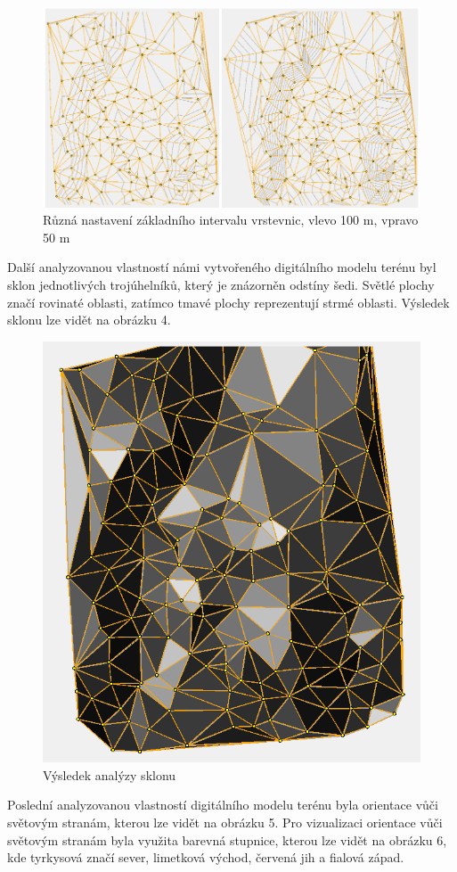 \documentclass{article}
\begin{document}
\begin{spacing}{1.5}
\begin{figure}[htbp]
    \centering
    \includegraphics[width=0.8\linewidth]{images/03vrstevnice.png}
    \caption{Různá nastavení základního intervalu vrstevnic, vlevo 100 m, vpravo 50 m}
    \label{fig:enter-label}
\end{figure}

\newpage
Další analyzovanou vlastností námi vytvořeného digitálního modelu terénu byl sklon jednotlivých trojúhelníků, který je znázorněn odstíny šedi. Světlé plochy značí rovinaté oblasti, zatímco tmavé plochy reprezentují strmé oblasti. Výsledek sklonu lze vidět na obrázku 4. 

\begin{figure}[htbp]
    \centering
    \includegraphics[width=0.4\linewidth]{images/04sklon.png}
    \caption{Výsledek analýzy sklonu}
    \label{fig:enter-label}
\end{figure}

Poslední analyzovanou vlastností digitálního modelu terénu byla orientace vůči světovým stranám, kterou lze vidět na obrázku 5. Pro vizualizaci orientace vůči světovým stranám byla využita barevná stupnice, kterou lze vidět na obrázku 6, kde tyrkysová značí sever, limetková východ, červená jih a fialová západ.


\end{spacing}
\end{document}
